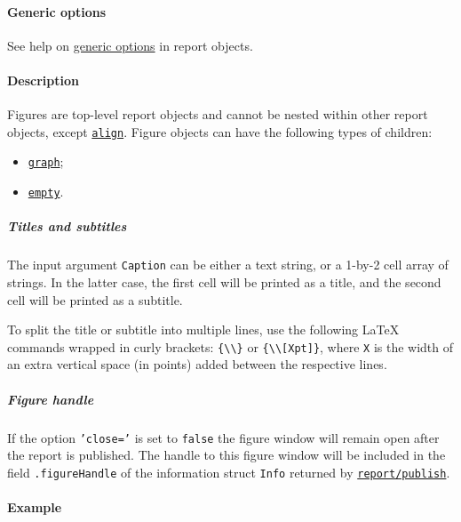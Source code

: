 \paragraph{Generic options}\label{generic-options}

See help on \href{report/Contents}{generic options} in report objects.

\paragraph{Description}\label{description}

Figures are top-level report objects and cannot be nested within other
report objects, except \href{report/align}{\texttt{align}}. Figure
objects can have the following types of children:

\begin{itemize}
\itemsep1pt\parskip0pt
\item
  \href{report/graph}{\texttt{graph}};
\item
  \href{report/empty}{\texttt{empty}}.
\end{itemize}

\subparagraph{Titles and subtitles}\label{titles-and-subtitles}

The input argument \texttt{Caption} can be either a text string, or a
1-by-2 cell array of strings. In the latter case, the first cell will be
printed as a title, and the second cell will be printed as a subtitle.

To split the title or subtitle into multiple lines, use the following
LaTeX commands wrapped in curly brackets:
\texttt{\{\textbackslash{}\textbackslash{}\}} or
\texttt{\{\textbackslash{}\textbackslash{}{[}Xpt{]}\}}, where \texttt{X}
is the width of an extra vertical space (in points) added between the
respective lines.

\subparagraph{Figure handle}\label{figure-handle}

If the option \texttt{'close='} is set to \texttt{false} the figure
window will remain open after the report is published. The handle to
this figure window will be included in the field \texttt{.figureHandle}
of the information struct \texttt{Info} returned by
\href{report/publish}{\texttt{report/publish}}.

\paragraph{Example}\label{example}


